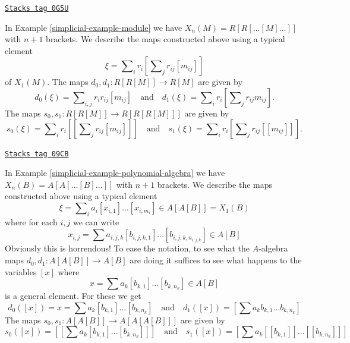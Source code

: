 \begin{example}
\label{simplicial-example-module-maps}
\href{https://stacks.math.columbia.edu/tag/0G5U}{\texttt{Stacks tag 0G5U}}

In Example \ref{simplicial-example-module} we have $X_n(M) = R[R[\ldots [M]\ldots]]$
with $n + 1$ brackets. We describe the maps constructed above using a
typical element
$$
\xi = \sum\nolimits_i r_i\left[\sum\nolimits_j r_{ij}[m_{ij}]\right]
$$
of $X_1(M)$. The maps $d_0, d_1 : R[R[M]] \to R[M]$ are given by
$$
d_0(\xi) = \sum\nolimits_{i, j} r_ir_{ij}[m_{ij}]
\quad\text{and}\quad
d_1(\xi) = \sum\nolimits_i r_i\left[\sum\nolimits_j r_{ij}m_{ij}\right].
$$
The maps $s_0, s_1 : R[R[M]] \to R[R[R[M]]]$
are given by
$$
s_0(\xi) =
\sum\nolimits_i r_i\left[\left[\sum\nolimits_j r_{ij}[m_{ij}]\right]\right]
\quad\text{and}\quad
s_1(\xi) = \sum\nolimits_i r_i\left[\sum\nolimits_j r_{ij}[[m_{ij}]]\right].
$$
\end{example}

\begin{example}
\label{simplicial-example-polynomial-algebra-maps}
\href{https://stacks.math.columbia.edu/tag/09CB}{\texttt{Stacks tag 09CB}}

In Example \ref{simplicial-example-polynomial-algebra} we have
$X_n(B) = A[A[\ldots [B]\ldots]]$ with $n + 1$ brackets.
We describe the maps constructed above using a typical element
$$
\xi = \sum\nolimits_i a_i [x_{i, 1}] \ldots [x_{i, m_i}] \in A[A[B]] = X_1(B)
$$
where for each $i, j$ we can write
$$
x_{i, j} = \sum a_{i, j, k} [b_{i, j, k, 1}] \ldots [b_{i, j, k, n_{i, j, k}}]
\in A[B]
$$
Obviously this is horrendous! To ease the notation, to see what the
$A$-algebra maps $d_0, d_1 : A[A[B]] \to A[B]$ are doing it suffices
to see what happens to the variables $[x]$ where
$$
x = \sum a_k [b_{k, 1}] \ldots [b_{k, n_k}] \in A[B]
$$
is a general element. For these we get
$$
d_0([x]) = x = \sum a_k [b_{k, 1}] \ldots [b_{k, n_k}]
\quad\text{and}\quad
d_1([x]) = \left[\sum a_k b_{k, 1} \ldots b_{k, n_k}\right]
$$
The maps $s_0, s_1 : A[A[B]] \to A[A[A[B]]]$ are given by
$$
s_0([x]) = \left[\left[\sum a_k [b_{k, 1}] \ldots [b_{k, n_k}]\right]\right]
\quad\text{and}\quad
s_1([x]) = \left[\sum a_k [[b_{k, 1}]] \ldots [[b_{k, n_k}]]\right]
$$
\end{example}

